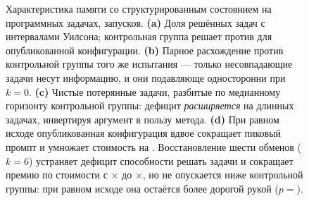 \begin{figure}[t]
\caption{Характеристика памяти со структурированным состоянием на \EOneTasks{}
программных задачах, \EOneRuns{} запусков. \textbf{(a)} Доля решённых задач
с интервалами Уилсона; контрольная группа решает \SolveBase{} против
\SolveTailZero{} для опубликованной конфигурации. \textbf{(b)} Парное
расхождение против контрольной группы того же испытания — только
несовпадающие задачи несут информацию, и они подавляюще односторонни при
$k{=}0$. \textbf{(c)} Чистые потерянные задачи, разбитые по медианному
горизонту контрольной группы: дефицит \emph{расширяется} на длинных
задачах, инвертируя аргумент в пользу метода. \textbf{(d)} При равном исходе
опубликованная конфигурация вдвое сокращает пиковый промпт и умножает
стоимость на \CostRatioTailZero. Восстановление шести обменов ($k{=}6$)
устраняет дефицит способности решать задачи и сокращает премию по стоимости
с \CostRatioTailZero$\times$ до \CostRatioTailSix$\times$, но не опускается
ниже контрольной группы: при равном исходе она остаётся более дорогой рукой
($p={}$\CostSignPTailSix).}
\label{fig:fourpanel}
\end{figure}
